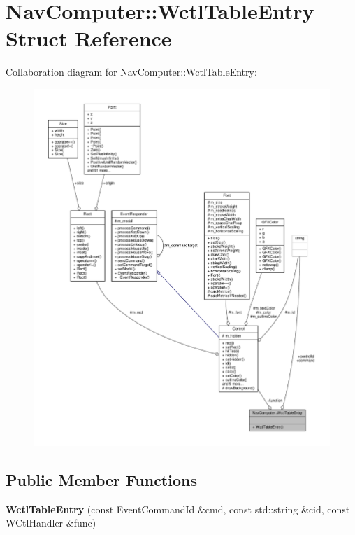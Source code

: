 \hypertarget{structNavComputer_1_1WctlTableEntry}{}\section{Nav\+Computer\+:\+:Wctl\+Table\+Entry Struct Reference}
\label{structNavComputer_1_1WctlTableEntry}


Collaboration diagram for Nav\+Computer\+:\+:Wctl\+Table\+Entry\+:
\nopagebreak
\begin{figure}[H]
\begin{center}
\leavevmode
\includegraphics[width=350pt]{d0/dd6/structNavComputer_1_1WctlTableEntry__coll__graph}
\end{center}
\end{figure}
\subsection*{Public Member Functions}
\begin{DoxyCompactItemize}
\item 
{\bfseries Wctl\+Table\+Entry} (const Event\+Command\+Id \&cmd, const std\+::string \&cid, const W\+Ctl\+Handler \&func)\hypertarget{structNavComputer_1_1WctlTableEntry_ae3b1eb0f5ebf558e541d6ec081f6e3d1}{}\label{structNavComputer_1_1WctlTableEntry_ae3b1eb0f5ebf558e541d6ec081f6e3d1}

\end{DoxyCompactItemize}
